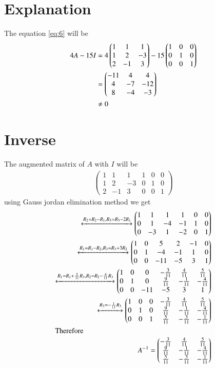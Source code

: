 \documentclass[journal,12pt,twocolumn]{IEEEtran}
\newcommand{\myvec}[1]{\ensuremath{\begin{pmatrix}#1\end{pmatrix}}}
\numberwithin{equation}{subsection}
\begin{document}
\section{Explanation}

The equation \eqref{eq:6} will be
\begin{align}
    4A-15I&=4\myvec{1&1&1 \\ 1&2&-3 \\ 2&-1&3}-15\myvec{1&0&0 \\ 0&1&0 \\ 0&0&1}\notag\\
    &=\myvec{-11&4&4\\4&-7&-12\\8&-4&-3}\notag\\
    &\neq0
\end{align}
\section{Inverse}
The augmented matrix of $A$ with $I$ will be
\begin{align}
    \myvec{1 & 1 & 1 & 1 & 0 & 0\\
       1 & 2 & -3 & 0 & 1 &0\\
       2 & -1 & 3 & 0 & 0 &1}
\end{align}
using Gauss jordan elimination method we get
\begin{align}
    \xleftrightarrow{R_2=R_2-R_1,R_3=R_3-2R_1}\myvec{1 & 1 & 1 & 1 & 0 & 0\\
       0 & 1 & -4 & -1 & 1 &0\\
       0 & -3 & 1 & -2 & 0 &1}\\
    \xleftrightarrow{R_1=R_1-R_2,R_3=R_3+3R_2}\myvec{1 & 0 & 5 & 2 & -1 & 0\\
       0 & 1 & -4 & -1 & 1 &0\\
       0 & 0 & -11 & -5 & 3 &1}\\
    \xleftrightarrow{R_1=R_1+\frac{5}{11}R_3,R_2=R_2-\frac{4}{11}R_3}\myvec{1 & 0 & 0 & -\frac{3}{11} & \frac{4}{11} & \frac{5}{11}\\
       0 & 1 & 0 & \frac{9}{11} & -\frac{1}{11} & -\frac{4}{11}\\
       0 & 0 & -11 & -5 & 3 &1}\\
     \xleftrightarrow{R_3=-\frac{1}{11}R_3}\myvec{1 & 0 & 0 & -\frac{3}{11} & \frac{4}{11} & \frac{5}{11}\\
       0 & 1 & 0 & \frac{9}{11} & -\frac{1}{11} & -\frac{4}{11}\\
       0 & 0 & 1 & \frac{5}{11} & -\frac{3}{11} & -\frac{1}{11}}\\
      \intertext{Therefore}
       A^-{^1}=\myvec{-\frac{3}{11} & \frac{4}{11} & \frac{5}{11}\\
       \frac{9}{11} & -\frac{1}{11} & -\frac{4}{11}\\
       \frac{5}{11} & -\frac{3}{11} & -\frac{1}{11}}
\end{align}
\end{document}
